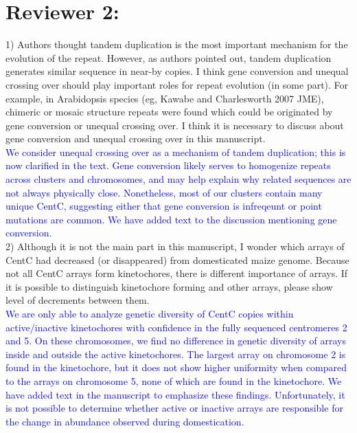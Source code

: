 \documentclass[]{article}
\newcommand{\res}[1]{\noindent \textcolor{blue}{{#1}} \\}
\begin{document}
\section*{Reviewer 2:}

1) Authors thought tandem duplication is the most important mechanism for the evolution of the repeat. However, as authors pointed out, tandem duplication generates similar sequence in near-by copies. I think gene conversion and unequal crossing over should play important roles for repeat evolution (in some part). For example, in Arabidopsis species (eg, Kawabe and Charlesworth 2007 JME), chimeric or mosaic structure repeats were found which could be originated by gene conversion or unequal crossing over. I think it is necessary to discuss about gene conversion and unequal crossing over in this manuscript.\\

\res{We consider unequal crossing over as a mechanism of tandem duplication; this is now clarified in the text.
Gene conversion likely serves to homogenize repeats across clusters and chromosomes, and may help explain why related sequences are not always physically close.
Nonetheless, most of our clusters contain many unique CentC, suggesting either that gene conversion is infreqeunt or point mutations are common. 
We have added text to the discussion mentioning gene conversion.} 


2) Although it is not the main part in this manuscript, I wonder which arrays of CentC had decreased (or disappeared) from domesticated maize genome. Because not all CentC arrays form kinetochores, there is different importance of arrays. If it is possible to distinguish kinetochore forming and other arrays, please show level of decrements between them.\\

\res{We are only able to analyze genetic diversity of CentC copies within active/inactive kinetochores with confidence in the fully sequenced centromeres 2 and 5.  
On these chromosomes, we find no difference in genetic diversity of arrays inside and outside the active kinetochores.  
The largest array on chromosome 2 is found in the kinetochore, but it does not show higher uniformity when compared to the arrays on chromosome 5, none of which are found in the kinetochore.  
We have added text in the manuscript to emphasize these findings.
Unfortunately, it is not possible to determine whether active or inactive arrays are responsible for the change in abundance observed during domestication.}
\end{document}
